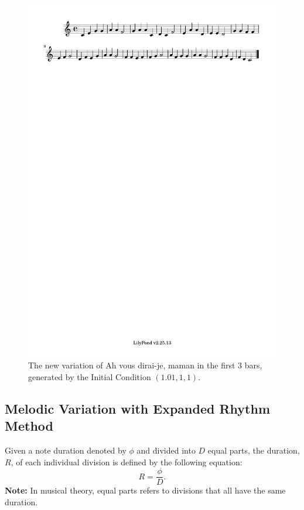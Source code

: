 \documentclass[11pt]{article}
\begin{document}
\begin{figure}
\centering
\includegraphics[trim=1cm 26.5cm 10.1cm 0.02cm, clip, scale=1]{dabby_2.pdf}
\caption{The new variation of Ah vous dirai-je, maman in the first 3 bars, generated by the Initial Condition $(1.01, 1, 1)$.}
\label{fig:Dabby2}
\end{figure}

\subsection{Melodic Variation with Expanded Rhythm Method} 
Given a note duration denoted by $\phi$ and divided into $D$ equal parts, the duration, $R$, of each individual division is defined by the following equation:
$$ R = \frac{\phi}{D}.  $$
\textbf{Note:} In musical theory, equal parts refers to divisions that all have the same duration.
\end{document}
